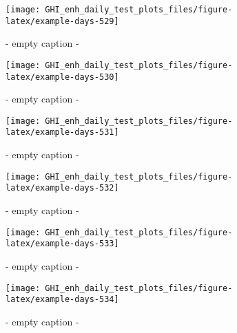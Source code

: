 \documentclass[
  10pt,
  a4paper,oneside]{article}
\begin{document}
\begin{figure}[H]

{\centering \texttt{[image: GHI\_enh\_daily\_test\_plots\_files/figure-latex/example-days-529]} 

}

\caption{ - empty caption - }\label{fig:example-days-529}
\end{figure}

\begin{figure}[H]

{\centering \texttt{[image: GHI\_enh\_daily\_test\_plots\_files/figure-latex/example-days-530]} 

}

\caption{ - empty caption - }\label{fig:example-days-530}
\end{figure}

\begin{figure}[H]

{\centering \texttt{[image: GHI\_enh\_daily\_test\_plots\_files/figure-latex/example-days-531]} 

}

\caption{ - empty caption - }\label{fig:example-days-531}
\end{figure}

\begin{figure}[H]

{\centering \texttt{[image: GHI\_enh\_daily\_test\_plots\_files/figure-latex/example-days-532]} 

}

\caption{ - empty caption - }\label{fig:example-days-532}
\end{figure}

\begin{figure}[H]

{\centering \texttt{[image: GHI\_enh\_daily\_test\_plots\_files/figure-latex/example-days-533]} 

}

\caption{ - empty caption - }\label{fig:example-days-533}
\end{figure}

\begin{figure}[H]

{\centering \texttt{[image: GHI\_enh\_daily\_test\_plots\_files/figure-latex/example-days-534]} 

}

\caption{ - empty caption - }\label{fig:example-days-534}
\end{figure}
\end{document}
